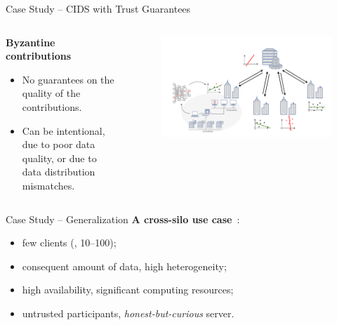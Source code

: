 \begin{frame}{Case Study -- CIDS with Trust Guarantees}
\begin{columns}
    \begin{column}{0.4\textwidth}
      \textbf{Byzantine contributions}
      \begin{itemize}
        \item No guarantees on the quality of the contributions.
        \item Can be intentional, due to poor data quality, or due to data distribution mismatches.
      \end{itemize}
    \end{column}
    
    \begin{column}{0.6\textwidth}
      \begin{figure}
        \centering
        \includegraphics[width=1.1\linewidth,right]{figures/intro/poisoning.drawio.pdf}
      \end{figure}
    \end{column}
  \end{columns}
\end{frame}

\begin{frame}{Case Study -- Generalization}
  \textbf{A cross-silo use case}~\cite{kairouz_AdvancesOpenProblems_2021}:
  \begin{itemize}
    \item few clients (\ie, 10--100);
    \item consequent amount of data, high heterogeneity;
    \item high availability, significant computing resources;
    \item untrusted participants, \emph{honest-but-curious} server.
  \end{itemize}
\end{frame}

